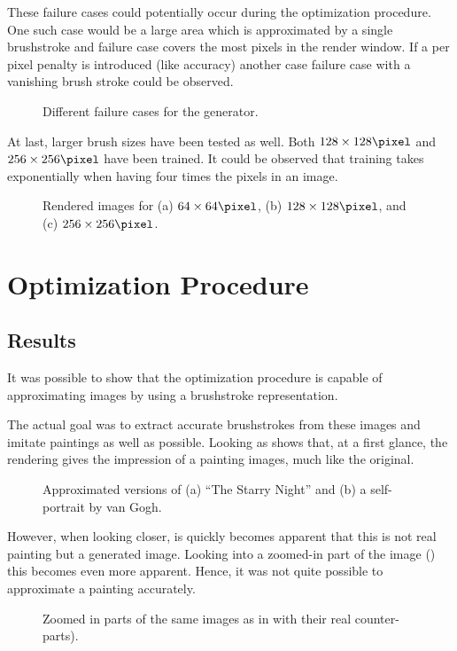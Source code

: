 These failure cases could potentially occur during the optimization procedure.\\
One such case would be a large area which is approximated by a single brushstroke and failure case covers the most pixels in the render window.
If a per pixel penalty is introduced (like accuracy) another case failure case with a vanishing brush stroke could be observed.
\begin{figure*}
    \caption[]{Different failure cases for the generator.}
\end{figure*}

At last, larger brush sizes have been tested as well.
Both $128\times128 \si{\pixel}$ and $256\times256 \si{\pixel}$ have been trained.
It could be observed that training takes exponentially when having four times the pixels in an image.
\begin{figure*}
    \caption[]{Rendered images for (a) $64\times64 \si{\pixel}$,  (b) $128\times128 \si{\pixel}$, and (c) $256\times256 \si{\pixel}$.}
\end{figure*}

\section{Optimization Procedure}
\subsection{Results}
It was possible to show that the optimization procedure is capable of approximating images by using a brushstroke representation.

The actual goal was to extract accurate brushstrokes from these images and imitate paintings as well as possible.
Looking as  shows that, at a first glance, the rendering gives the impression of a painting images, much like the original.\\
\begin{figure*}
    \caption[]{Approximated versions of (a) ``The Starry Night'' and (b) a self-portrait by van Gogh.}
\end{figure*}
However, when looking closer, is quickly becomes apparent that this is not real painting but a generated image.
Looking into a zoomed-in part of the image () this becomes even more apparent.
Hence, it was not quite possible to approximate a painting accurately.
\begin{figure*}
    \caption[]{Zoomed in parts of the same images as in  with their real counter-parts).}
\end{figure*}

